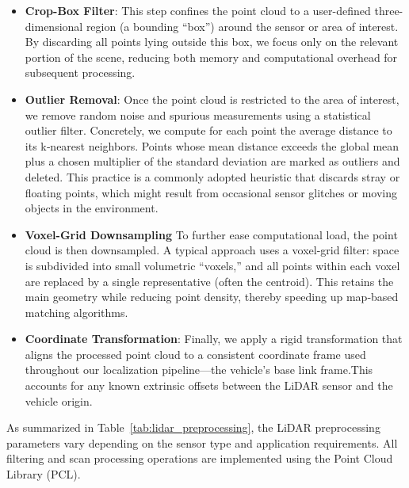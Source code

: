 \begin{itemize}
    \item \textbf{Crop-Box Filter}: This step confines the point cloud to a user-defined three-dimensional region (a bounding “box”) around the sensor or area of interest. By discarding all points lying outside this box, we focus only on the relevant portion of the scene, reducing both memory and computational overhead for subsequent processing.
    \item \textbf{Outlier Removal}: Once the point cloud is restricted to the area of interest, we remove random noise and spurious measurements using a statistical outlier filter. Concretely, we compute for each point the average distance to its k‐nearest neighbors. Points whose mean distance exceeds the global mean plus a chosen multiplier of the standard deviation are marked as outliers and deleted. This practice is a commonly adopted heuristic that discards stray or floating points, which might result from occasional sensor glitches or moving objects in the environment.
    \item \textbf{Voxel-Grid Downsampling} To further ease computational load, the point cloud is then downsampled. A typical approach uses a voxel-grid filter: space is subdivided into small volumetric “voxels,” and all points within each voxel are replaced by a single representative (often the centroid). This retains the main geometry while reducing point density, thereby speeding up map‐based matching algorithms.
    \item \textbf{Coordinate Transformation}:   Finally, we apply a rigid transformation that aligns the processed point cloud to a consistent coordinate frame used throughout our localization pipeline—the vehicle’s base link frame.This accounts for any known extrinsic offsets between the LiDAR sensor and the vehicle origin.
\end{itemize}

As summarized in Table~\ref{tab:lidar_preprocessing}, the LiDAR preprocessing parameters vary depending on the sensor type and application requirements. All filtering and scan processing operations are implemented using the Point Cloud Library (PCL).



